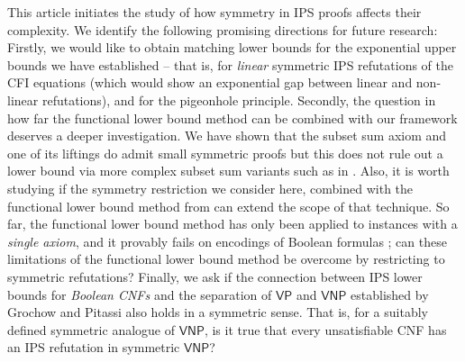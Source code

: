 \documentclass[a4paper,UKenglish,cleveref, autoref, thm-restate]{lipics-v2021}
\newcommand{\VNP}{\mathsf{VNP}}
\newcommand{\VP}{\mathsf{VP}}
\begin{document}
This article initiates the study of how symmetry in IPS proofs affects their complexity. We identify the following promising directions for future research:
Firstly, we would like to obtain matching lower bounds for the exponential upper bounds we have established -- that is, for \emph{linear} symmetric IPS refutations of the CFI equations (which would show an exponential gap between linear and non-linear refutations), and for the pigeonhole principle. 
Secondly, the question in how far the functional lower bound method \cite{lowerbounds_IPS, govindasamy2022simple, hakoniemi2024functional} can be combined with our framework deserves a deeper investigation. We have shown that the subset sum axiom and one of its liftings do admit small symmetric proofs but this does not rule out a lower bound via more complex subset sum variants such as in \cite{govindasamy2022simple, hakoniemi2024functional}. 
Also, it is worth studying if the symmetry restriction we consider here, combined with the functional lower bound method from \cite{govindasamy2022simple, hakoniemi2024functional} can extend the scope of that technique. So far, the functional lower bound method has only been applied to instances with a \emph{single axiom}, and it provably fails on encodings of Boolean formulas \cite{hakoniemi2024functional}; can these limitations of the functional lower bound method be overcome by restricting to symmetric refutations?
Finally, we ask if the connection between IPS lower bounds for \emph{Boolean CNFs} and the separation of $\VP$ and $\VNP$ established by Grochow and Pitassi \cite{IPS} also holds in a symmetric sense. 
That is, for a suitably defined symmetric analogue of $\VNP$, is it true that every unsatisfiable CNF has an IPS refutation in symmetric $\VNP$?

 










\newpage
\appendix
\end{document}
